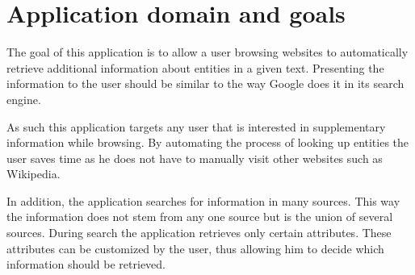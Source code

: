 \section{Application domain and goals}
The goal of this application is to allow a user browsing websites to automatically retrieve additional information about entities in a given text. Presenting the information to the user should be similar to the way Google does it in its search engine. 

As such this application targets any user that is interested in supplementary information while browsing. By automating the process of looking up entities the user saves time as he does not have to manually visit other websites such as Wikipedia. 

In addition, the application searches for information in many sources. This way the information does not stem from any one source but is the union of several sources.  During search the application retrieves only certain attributes. These attributes can be customized by the user, thus allowing him to decide which information should be retrieved. 